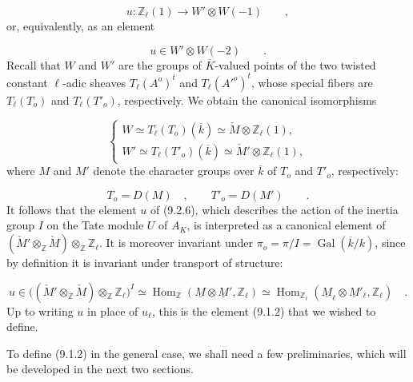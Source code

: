 \begin{equation}\tag{9.2.5}
u:\mathbb{Z}_{\ell}(1)\longrightarrow W'\otimes W(-1)
 \qquad ,
\end{equation}
or, equivalently, as an element

\begin{equation}\tag{9.2.6}
u\in W'\otimes W(-2) \qquad .
\end{equation}
Recall that $W$ and $W'$ are the groups of $\overline K$-valued
points of the two twisted constant $\ell$-adic sheaves
$T_{\ell}(A^o)^t$ and $T_{\ell}({A'}^o)^t$, whose special fibers are
$T_{\ell}(T_o)$ and $T_{\ell}(T'_o)$, respectively. We obtain the
canonical isomorphisms

\begin{equation}\tag{9.2.7}
\left\{
\begin{array}{l}
W\simeq T_{\ell}(T_o)(\overline k)
 \simeq\check M\otimes\mathbb{Z}_{\ell}(1),\\[3ex]
W'\simeq T_{\ell}(T'_o)(\overline k)
 \simeq\check M'\otimes\mathbb{Z}_{\ell}(1),
\end{array}
\right.
\end{equation}
where $M$ and $M'$ denote the character groups over $\overline k$
of $T_o$ and $T'_o$, respectively:

\begin{equation}\tag{9.2.8}
T_o=D(M) \quad , \qquad T'_o=D(M') \qquad .
\end{equation}
It follows that the element $u$ of (9.2.6), which describes the
action of the inertia group $I$ on the Tate module $U$ of $A_K$, is
interpreted as a canonical element of
$(\check M'\otimes_{\mathbb{Z}}\check M)
 \otimes_{\mathbb{Z}}\mathbb{Z}_{\ell}$. It is moreover invariant
under $\pi_o=\pi/I=\operatorname{Gal}(\overline k/k)$, since by
definition it is invariant under transport of structure:

\begin{equation}\tag{9.2.9}
u\in
\bigl((\check M'\otimes_{\mathbb{Z}}\check M)
 \otimes_{\mathbb{Z}}\mathbb{Z}_{\ell}\bigr)^I
\simeq
\operatorname{Hom}_{\mathbb{Z}}
 (\underline M\otimes\underline M',\mathbb{Z}_{\ell})
\simeq
\operatorname{Hom}_{\mathbb{Z}_{\ell}}
 (\underline M_{\ell}\otimes\underline M'_{\ell},
  \mathbb{Z}_{\ell}) \quad .
\end{equation}
Up to writing $u$ in place of $u_{\ell}$, this is the element
(9.1.2) that we wished to define.

To define (9.1.2) in the general case, we shall need a few
preliminaries, which will be developed in the next two sections.
